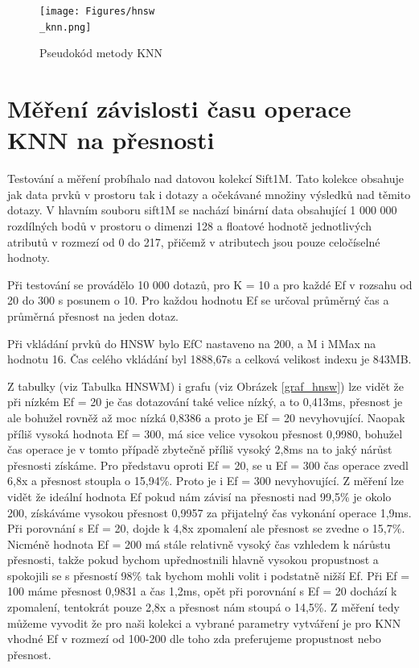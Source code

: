 \documentclass[czech,semestral,dept460,male,csharp,cpdeclaration]{diploma}
\begin{document}
		\begin{figure}
			\centering
			\texttt{[image: Figures/hnsw\\\_knn.png]}
			\caption{Pseudokód metody KNN}
			\label{hnsw_knn}
		\end{figure}
		
		\newpage
		
		\section{Měření závislosti času operace KNN na přesnosti}
		
		Testování a měření probíhalo nad datovou kolekcí Sift1M. Tato kolekce obsahuje jak data prvků v prostoru tak i dotazy a očekávané množiny výsledků nad těmito dotazy. V hlavním souboru sift1M se nachází binární data obsahující 1 000 000 rozdílných bodů v prostoru o dimenzi 128 a floatové hodnotě jednotlivých atributů v rozmezí od 0 do 217, přičemž v atributech jsou pouze celočíselné hodnoty.
		
		Při testování se provádělo 10 000 dotazů, pro K = 10 a pro každé Ef v rozsahu od 20 do 300 s posunem o 10. Pro každou hodnotu Ef se určoval průměrný čas a průměrná přesnost na jeden dotaz.
		
		Při vkládání prvků do HNSW bylo EfC nastaveno na 200, a M i MMax na hodnotu 16. Čas celého vkládání byl 1888,67s a celková velikost indexu je 843MB.
		
		Z tabulky (viz Tabulka {HNSWM}) i grafu (viz Obrázek \ref{graf_hnsw}) lze vidět že při nízkém Ef = 20 je čas dotazování také velice nízký, a to 0,413ms, přesnost je ale bohužel rovněž až moc nízká 0,8386 a proto je Ef = 20 nevyhovující. Naopak příliš vysoká hodnota Ef = 300, má sice velice vysokou přesnost 0,9980, bohužel čas operace je v tomto případě zbytečně příliš vysoký 2,8ms na to jaký nárůst přesnosti získáme. Pro představu oproti Ef = 20, se u Ef = 300 čas operace zvedl 6,8x a přesnost stoupla o 15,94\%. Proto je i Ef = 300 nevyhovující. Z měření lze vidět že ideální hodnota Ef pokud nám závisí na přesnosti nad 99,5\% je okolo 200, získáváme vysokou přesnost 0,9957 za přijatelný čas vykonání operace 1,9ms. Při porovnání s Ef = 20, dojde k 4,8x zpomalení ale přesnost se zvedne o 15,7\%. Nicméně hodnota Ef = 200 má stále relativně vysoký čas vzhledem k nárůstu přesnosti, takže pokud bychom upřednostnili hlavně vysokou propustnost a spokojili se s přesností 98\% tak bychom mohli volit i podstatně nižší Ef. Při Ef = 100 máme přesnost 0,9831 a čas 1,2ms, opět při porovnání s Ef = 20 dochází k zpomalení, tentokrát pouze 2,8x a přesnost nám stoupá o 14,5\%. Z měření tedy můžeme vyvodit že pro naši kolekci a vybrané parametry vytváření je pro KNN vhodné Ef v rozmezí od 100-200 dle toho zda preferujeme propustnost nebo přesnost.
		
\end{document}
